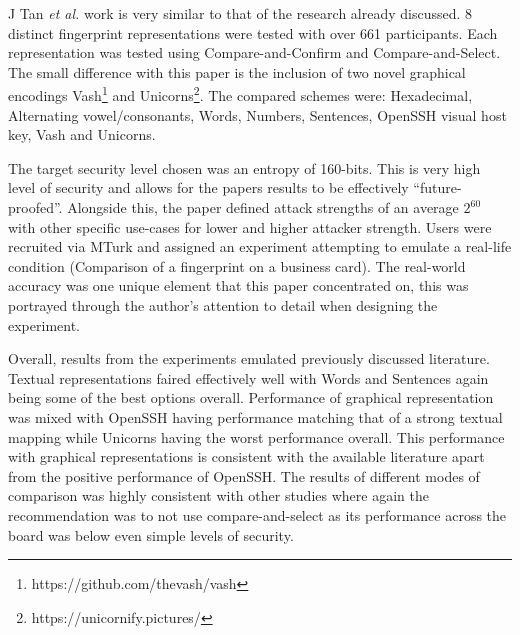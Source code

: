 J Tan \textit{et al.} work is very similar to that of the research already discussed. 8 distinct fingerprint representations were tested with over 661 participants. Each representation was tested using Compare-and-Confirm and Compare-and-Select. The small difference with this paper is the inclusion of two novel graphical encodings Vash\footnote{https://github.com/thevash/vash} and Unicorns\footnote{https://unicornify.pictures/}. The compared schemes were: Hexadecimal, Alternating vowel/consonants, Words, Numbers, Sentences, OpenSSH visual host key, Vash and Unicorns.

The target security level chosen was an entropy of 160-bits. This is very high level of security and allows for the papers results to be effectively ``future-proofed''. Alongside this, the paper defined attack strengths of an average $2^{60}$ with other specific use-cases for lower and higher attacker strength. Users were recruited via MTurk and assigned an experiment attempting to emulate a real-life condition (Comparison of a fingerprint on a business card). The real-world accuracy was one unique element that this paper concentrated on, this was portrayed through the author's attention to detail when designing the experiment.

Overall, results from the experiments emulated previously discussed literature. Textual representations faired effectively well with Words and Sentences again being some of the best options overall. Performance of graphical representation was mixed with OpenSSH having performance matching that of a strong textual mapping while Unicorns having the worst performance overall. This performance with graphical representations is consistent with the available literature apart from the positive performance of OpenSSH. The results of different modes of comparison was highly consistent with other studies where again the recommendation was to not use compare-and-select as its performance across the board was below even simple levels of security.